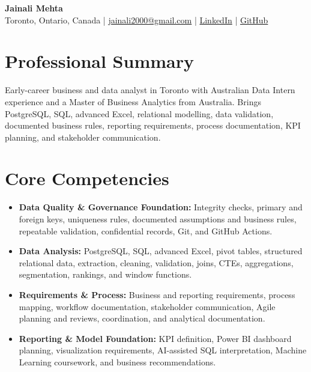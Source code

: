 \documentclass[letterpaper,10pt]{article}
\begin{document}
\begin{center}
  {\fontsize{17}{19}\selectfont\textbf{Jainali Mehta}}\\[2pt]
  \small Toronto, Ontario, Canada \;|\;
  \href{mailto:jainali2000@gmail.com}{jainali2000@gmail.com} \;|\;
  \href{https://www.linkedin.com/in/jainali-mehta}{LinkedIn} \;|\;
  \href{https://github.com/jainalimehta}{GitHub}
\end{center}
\vspace{-7pt}

\section{Professional Summary}
\small Early-career business and data analyst in Toronto with Australian Data Intern experience and a Master of Business Analytics from Australia. Brings PostgreSQL, SQL, advanced Excel, relational modelling, data validation, documented business rules, reporting requirements, process documentation, KPI planning, and stakeholder communication.

\section{Core Competencies}
\begin{itemize}[leftmargin=0.16in,label=\textbullet,topsep=0pt,itemsep=1pt,parsep=0pt]
  \item \small \textbf{Data Quality \& Governance Foundation:} Integrity checks, primary and foreign keys, uniqueness rules, documented assumptions and business rules, repeatable validation, confidential records, Git, and GitHub Actions.
  \item \small \textbf{Data Analysis:} PostgreSQL, SQL, advanced Excel, pivot tables, structured relational data, extraction, cleaning, validation, joins, CTEs, aggregations, segmentation, rankings, and window functions.
  \item \small \textbf{Requirements \& Process:} Business and reporting requirements, process mapping, workflow documentation, stakeholder communication, Agile planning and reviews, coordination, and analytical documentation.
  \item \small \textbf{Reporting \& Model Foundation:} KPI definition, Power BI dashboard planning, visualization requirements, AI-assisted SQL interpretation, Machine Learning coursework, and business recommendations.
\end{itemize}
\end{document}
